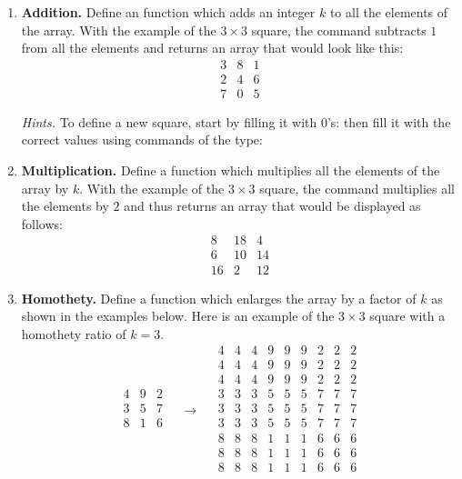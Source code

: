 \documentclass[11pt,class=report,crop=false]{standalone}
\begin{document}
\begin{activite}
\begin{enumerate}
  
  \item \textbf{Addition.} Define an  function
  which adds an integer $k$ to all the elements of the array. With the example of the $3\times 3$ square, the command  subtracts $1$ from all the elements and returns an array that would look like this:
$$\begin{array}{ccc}
3&8&1\\2&4&6\\7&0&5
\end{array}$$  

\emph{Hints.} To define a new square, start by filling it with $0$'s:
then fill it with the correct values using commands of the type:

  \item \textbf{Multiplication.} Define a  function
  which multiplies all the elements of the array by $k$. With the example of the  $3\times 3$ square, the  command multiplies all the elements by $2$ and thus returns an array that would be displayed as follows:
$$\begin{array}{ccc}
8&18&4\\6&10&14\\16&2&12
\end{array}$$ 
  
  \item \textbf{Homothety.} Define a  function
  which enlarges the array by a factor of $k$ as shown in the examples below. 
  Here is an example of the $3 \times 3$ square with a homothety ratio of $k=3$.
 $$
  \begin{array}{c|c|c}  
  4& 9& 2\\\hline
  3& 5& 7\\\hline
  8& 1& 6\\  
  \end{array} 
\quad  \longrightarrow\quad
  \begin{array}{ccc|ccc|ccc}  
  4& 4& 4& 9& 9& 9& 2& 2& 2\\
  4& 4& 4& 9& 9& 9& 2& 2& 2\\ 
  4& 4& 4& 9& 9& 9& 2& 2& 2\\\hline
  3& 3& 3& 5& 5& 5& 7& 7& 7\\
  3& 3& 3& 5& 5& 5& 7& 7& 7\\
  3& 3& 3& 5& 5& 5& 7& 7& 7\\\hline
  8& 8& 8& 1& 1& 1& 6& 6& 6\\
  8& 8& 8& 1& 1& 1& 6& 6& 6\\
  8& 8& 8& 1& 1& 1& 6& 6& 6 \\
  \end{array}
$$
  

\end{enumerate}
\end{activite}
\end{document}
